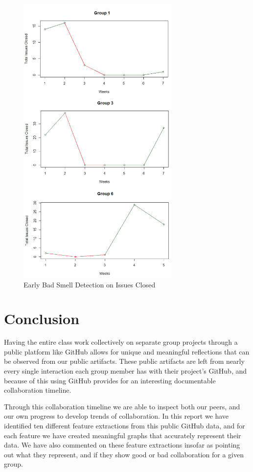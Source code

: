 \documentclass{acm_proc_article-sp}
\begin{document}
\begin{figure}[h]
\centering
\includegraphics[width=8cm]{img/closedDetect}
\caption{Early Bad Smell Detection on Issues Closed}
\label{fig:closedDetect}
\end{figure}

\section{Conclusion}\label{sec:conclusion}

Having the entire class work collectively on separate group projects through a public platform like GitHub allows for unique and meaningful reflections that can be observed from our public artifacts. These public artifacts are left from nearly every single interaction each group member has with their project's GitHub, and because of this using GitHub provides for an interesting documentable collaboration timeline. 

Through this collaboration timeline we are able to inspect both our peers, and our own progress to develop trends of collaboration. In this report we have identified ten different feature extractions from this public GitHub data, and for each feature we have created meaningful graphs that accurately represent their data. We have also commented on these feature extractions insofar as pointing out what they represent, and if they show good or bad collaboration for a given group.
\end{document}
